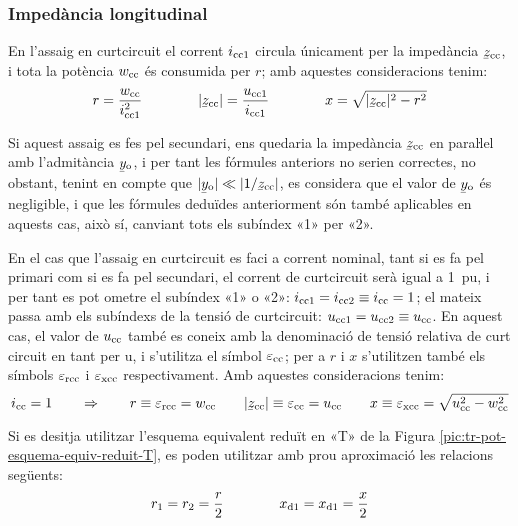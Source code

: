 \subsubsection{Impedància longitudinal}

En l'assaig en curtcircuit el corrent $i_\mathrm{cc1}$ circula
únicament per la impedància $\cmplx{z}\ped{cc}$, i tota la potència
$w_\mathrm{cc}$ és consumida per $r$; amb aquestes consideracions tenim:
\begin{equation}
    r = \frac{w\ped{cc}}{i\ped{cc1}^2} \qquad\qquad
    |\cmplx{z}\ped{cc}| = \frac{u\ped{cc1}}{i\ped{cc1}} \qquad\qquad
    x = \sqrt{|\cmplx{z}\ped{cc}|^2 - r^2}
\end{equation}

Si aquest assaig es fes pel secundari, ens quedaria la impedància
$\cmplx{z}\ped{cc}$ en paraŀlel amb l'admitància
$\cmplx{y}\ped{o}$, i per tant les fórmules anteriors no serien
correctes, no obstant, tenint en compte que $|\cmplx{y}\ped{o}| \ll
|1/\cmplx{z}\ped{cc}|$, es considera que el valor de
$\cmplx{y}\ped{o}$ és negligible, i que les fórmules deduïdes
anteriorment són també aplicables en aquests cas, això sí, canviant
tots els subíndex «1» per «2».

En el cas que l'assaig en curtcircuit es faci a corrent nominal,
tant  si es fa pel primari  com si es fa pel secundari, el corrent
de curtcircuit serà igual a \SI{1}{pu}, i per tant es pot ometre el
subíndex «1» o «2»: $i_\mathrm{cc1} = i_\mathrm{cc2} \equiv i_\mathrm{cc} = 1$;
el mateix passa amb els subíndexs de la tensió de curtcircuit:
$u_\mathrm{cc1} = u_\mathrm{cc2} \equiv u_\mathrm{cc}$. En aquest cas, el valor
de $u_\mathrm{cc}$ també es coneix amb la denominació de
tensió relativa de curt  circuit en tant per u, i s'utilitza  el
símbol $\varepsilon_\mathrm{cc}$; per a $r$ i $x$ s'utilitzen també els
símbols $\varepsilon_\mathrm{rcc}$ i $\varepsilon_\mathrm{xcc}$
respectivament. Amb aquestes consideracions tenim:
\begin{equation}
    i\ped{cc} = 1 \qquad \Rightarrow \qquad r \equiv \varepsilon\ped{rcc} = w\ped{cc} \qquad
    |\cmplx{z}\ped{cc}| \equiv \varepsilon\ped{cc} = u\ped{cc} \qquad
    x \equiv \varepsilon\ped{xcc} = \sqrt{u\ped{cc}^2 - w\ped{cc}^2}
    \label{eq:assaig-cc-nomianl}
\end{equation}

Si es desitja utilitzar l'esquema equivalent reduït en «T» de la Figura \vref{pic:tr-pot-esquema-equiv-reduit-T}, es poden utilitzar amb prou aproximació les relacions següents:
\begin{equation}
    r_1 = r_2 = \frac{r}{2} \qquad\qquad x_\mathrm{d1} = x_\mathrm{d1} = \frac{x}{2}
\end{equation}



